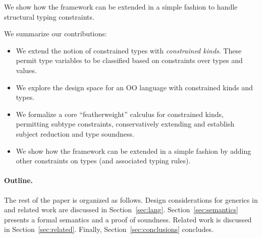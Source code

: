 We show how the framework can be extended in a simple fashion to
handle structural typing constraints.

We summarize our contributions:
\begin{itemize}

\item We extend the notion of constrained types \cite{constrained-types} with {\em constrained kinds}. These permit type variables to be classified based on constraints over types and values. 
\item We explore the design space for an OO language with constrained kinds and types.
\item We formalize a core ``featherweight'' calculus for constrained kinds, permitting subtype constraints, conservatively extending \cite{constrained-types} and establish subject reduction and type soundness.
\item 
We show how the framework can be extended in a simple fashion by adding other constraints on types (and associated typing rules).
\end{itemize}

\paragraph{Outline.}

The rest of the paper is organized as follows.
%
Design considerations for generics in \Xten{}
and related work are
discussed in Section~\ref{sec:lang}.
%
Section~\ref{sec:semantics} presents a formal semantics and a
proof of soundness.
%
Related work is discussed in Section~\ref{sec:related}.
%
Finally, Section~\ref{sec:conclusions} concludes.


